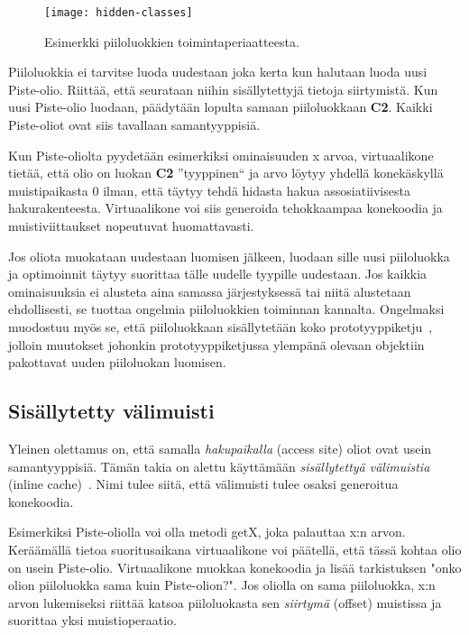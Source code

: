 \begin{figure}[ht]
    \texttt{[image: hidden-classes]}
    \caption{Esimerkki piiloluokkien toimintaperiaatteesta.}
     \centering
     \label{fig:hiddenclass}
\end{figure}

Piiloluokkia ei tarvitse luoda uudestaan joka kerta kun halutaan luoda uusi Piste-olio. Riittää, että seurataan niihin sisällytettyjä tietoja siirtymistä. Kun uusi Piste-olio luodaan, päädytään lopulta samaan piiloluokkaan \textbf{C2}. Kaikki Piste-oliot ovat siis tavallaan samantyyppisiä.

Kun Piste-oliolta pyydetään esimerkiksi ominaisuuden x arvoa, virtuaalikone tietää, että olio on luokan \textbf{C2} ''tyyppinen`` ja arvo löytyy yhdellä konekäskyllä muistipaikasta 0 ilman, että täytyy tehdä hidasta hakua assosiatiivisesta hakurakenteesta. Virtuaalikone voi siis generoida tehokkaampaa konekoodia ja muistiviittaukset nopeutuvat huomattavasti.

Jos oliota muokataan uudestaan luomisen jälkeen, luodaan sille uusi piiloluokka ja optimoinnit täytyy suorittaa tälle uudelle tyypille uudestaan. Jos kaikkia ominaisuuksia ei alusteta aina samassa järjestyksessä tai niitä alustetaan ehdollisesti, se tuottaa ongelmia piiloluokkien toiminnan kannalta. Ongelmaksi muodostuu myös se, että piiloluokkaan sisällytetään koko prototyyppiketju~\cite[s.~499]{Ahn2014}, jolloin muutokset johonkin prototyyppiketjussa ylempänä olevaan objektiin pakottavat uuden piiloluokan luomisen.

\subsection{Sisällytetty välimuisti}

Yleinen olettamus on, että samalla \textit{hakupaikalla} (access site) oliot ovat usein samantyyppisiä. Tämän takia on alettu käyttämään \textit{sisällytettyä välimuistia} (inline cache)~\cite[s.~498]{Ahn2014}. Nimi tulee siitä, että välimuisti tulee osaksi generoitua konekoodia.

Esimerkiksi Piste-oliolla voi olla metodi getX, joka palauttaa x:n arvon. Keräämällä tietoa suoritusaikana virtuaalikone voi päätellä, että tässä kohtaa olio on usein Piste-olio. Virtuaalikone muokkaa konekoodia ja lisää tarkistuksen "onko olion piiloluokka sama kuin Piste-olion?". Jos oliolla on sama piiloluokka, x:n arvon lukemiseksi riittää katsoa piiloluokasta sen \textit{siirtymä} (offset) muistissa ja suorittaa yksi muistioperaatio.

